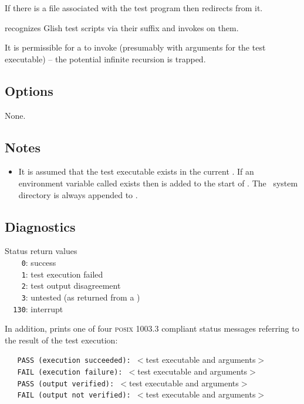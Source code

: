 If there is a  file associated with the test program then
 redirects  from it.

 recognizes Glish test scripts via their  suffix and
invokes  on them.

It is permissible for a  to invoke  (presumably with
arguments for the test executable) -- the potential infinite recursion is
trapped.
 
\subsection*{Options}
 
None.
 
\subsection*{Notes}
 
\begin{itemize}
\item
   It is assumed that the test executable exists in the current .
   If an environment variable called  exists then
    is added to the start of .  The \aipspp\
   system  directory is always appended to .
\end{itemize}

\subsection*{Diagnostics}
 
Status return values
\\ \verb+    0+: success
\\ \verb+    1+: test execution failed
\\ \verb+    2+: test output disagreement
\\ \verb+    3+: untested (as returned from a )
\\ \verb+  130+: interrupt

\noindent
In addition,  prints one of four \textsc{posix 1003.3} compliant
status messages referring to the result of the test execution:

\noindent
\verb+   PASS (execution succeeded): +$<$test executable and arguments$>$ \\
\verb+   FAIL (execution failure): +$<$test executable and arguments$>$ \\
\verb+   PASS (output verified): +$<$test executable and arguments$>$ \\
\verb+   FAIL (output not verified): +$<$test executable and arguments$>$
 

